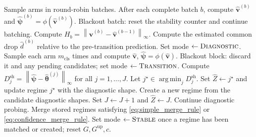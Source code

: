 \documentclass[11pt]{article}
\newcommand{\norm}[1]{\left\lVert #1 \right\rVert}
\DeclareMathOperator*{\argmin}{arg\,min}
\begin{document}
\begin{algorithm}[p]
\caption{LI-TAR-UCB (continued): \textsc{Transition} and \textsc{Diagnostic} modes}
\label{alg:li_tar_ucb_cont}
\footnotesize
\begin{algorithmic}[1]
        \State Sample arms in round-robin batches.
        \State After each complete batch $b$, compute $\widehat{\bm v}^{(b)}$ and $\widehat{\bm\psi}^{(b)}=\phi(\widehat{\bm v}^{(b)})$.
            \State Blackout batch: reset the stability counter and continue batching.
        \Else
            \State Compute $H_b=\norm{\widehat{\bm v}^{(b)}-\widehat{\bm v}^{(b-1)}}_{\infty}$.
            \State Compute the estimated common drop $\widehat d^{(b)}$ relative to the pre-transition prediction.
                \State Set mode $\gets\textsc{Diagnostic}$.
            \EndIf
        \EndIf
        \State Sample each arm $m_{\mathrm{cls}}$ times and compute $\widehat{\bm v}$, $\widehat{\bm\psi}=\phi(\widehat{\bm v})$.
            \State Blackout block: discard it and any pending candidates; set mode $\gets\textsc{Transition}$.
        \Else
            \State Compute $D_j^{\mathrm{sh}}=\norm{\widehat{\bm\psi}-\widehat{\bm\theta}^{(j)}}_{\infty}$ for all $j=1,\ldots,J$.
            \State Let $j^\star\in\argmin_j D_j^{\mathrm{sh}}$.
                \State Set $\widehat Z\gets j^\star$ and update regime $j^\star$ with the diagnostic shape.
                \State Create a new regime from the candidate diagnostic shapes.
                \State Set $J\gets J+1$ and $\widehat Z\gets J$.
            \Else
                \State Continue diagnostic probing.
            \EndIf
            \State Merge stored regimes satisfying \eqref{eq:simple_merge_rule} or \eqref{eq:confidence_merge_rule}.
            \State Set mode $\gets\textsc{Stable}$ once a regime has been matched or created; reset $G,G^{\mathrm{up}},c$.
        \EndIf
    \EndIf
\EndFor
\end{algorithmic}
\end{algorithm}
\end{document}
